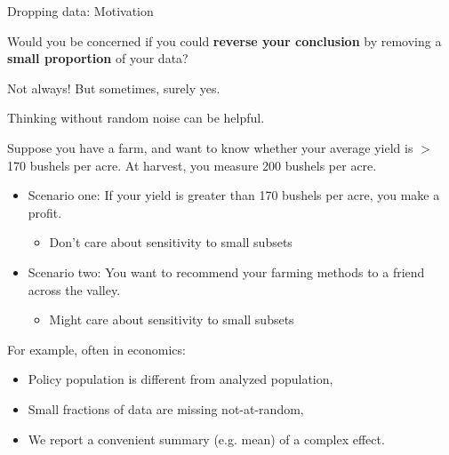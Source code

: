 \begin{frame}{Dropping data: Motivation}

Would you be concerned if you could \textbf{reverse your conclusion} by removing
a \textbf{small proportion} of your data?

Not always!  But sometimes, surely yes.

Thinking without random noise can be helpful.

Suppose you have a farm, and want to know whether
your average yield is $>$ 170 bushels per acre.
At harvest, you measure 200 bushels per acre.

\begin{itemize}
    \item Scenario one: If your yield is greater than 170 bushels
        per acre, you make a profit.
        \begin{itemize}
            \item Don’t care about sensitivity to small subsets
        \end{itemize}
    \item Scenario two: You want to recommend your farming
    methods to a friend across the valley.
    \begin{itemize}
        \item Might care about sensitivity to small subsets
    \end{itemize}
\end{itemize}

For example, often in economics:
%
\begin{itemize}
\item Policy population is different from analyzed population,
\item Small fractions of data are missing not-at-random,
\item We report a convenient summary (e.g. mean) of a complex effect.
\end{itemize}


\end{frame}
